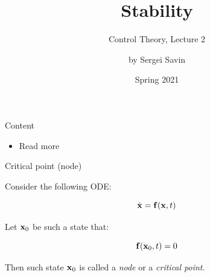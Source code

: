 \documentclass{beamer}
\title{Stability}
\subtitle{Control Theory, Lecture 2}
\author{by Sergei Savin}
\date{Spring 2021}
\begin{document}
\maketitle


\begin{frame}{Content}

\begin{itemize}
\item Read more
\end{itemize}

\end{frame}



\begin{frame}{Critical point (node)}
\begin{flushleft}

Consider the following ODE:

\begin{equation}
    \dot{\mathbf{x}} = \mathbf{f} (\mathbf{x}, t)
\end{equation}

Let $\mathbf{x}_0$ be such a state that:

\begin{equation}
    \mathbf{f} (\mathbf{x}_0, t) = 0
\end{equation}

Then such state $\mathbf{x}_0$ is called a \emph{node} or a \emph{critical point}.

\end{flushleft}
\end{frame}
\end{document}

